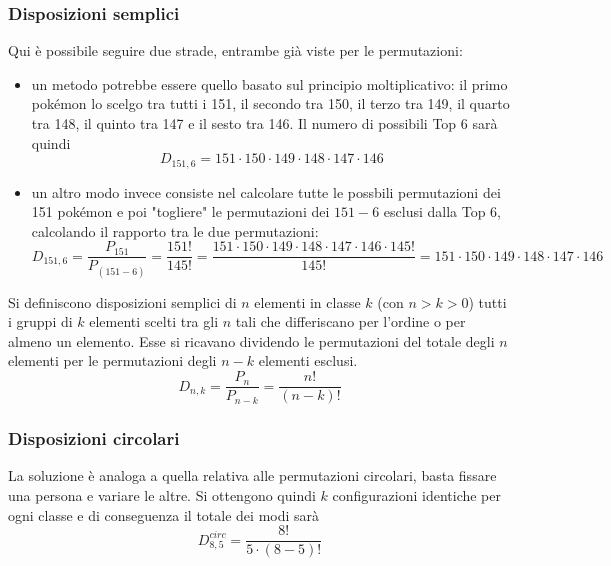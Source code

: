 \documentclass{article}     %
\begin{document}
            \subsubsection{Disposizioni semplici}
            \begin{ex}
                
            
            Qui è possibile seguire due strade, entrambe già viste per le permutazioni: 
            \begin{itemize}
                \item un metodo potrebbe essere quello basato sul principio moltiplicativo: il primo pokémon lo scelgo tra tutti i 151, il secondo tra 150, il terzo tra 149, il quarto tra 148, il quinto tra 147 e il sesto tra 146. Il numero di possibili Top 6 sarà quindi \[D_{151,6}=151\cdot150\cdot149\cdot148\cdot147\cdot146\]
                \item un altro modo invece consiste nel calcolare tutte le possbili permutazioni dei 151 pokémon e poi "togliere" le permutazioni dei $151-6$ esclusi dalla Top 6, calcolando il rapporto tra le due permutazioni: \[D_{151,6}=\frac{P_{151}}{P_{(151-6)}}=\frac{151!}{145!}=\frac{151\cdot150\cdot149\cdot148\cdot147\cdot146\cdot145!}{145!}=151\cdot150\cdot149\cdot148\cdot147\cdot146\]
            \end{itemize}
        \end{ex} 
            \begin{boxdef}
                Si definiscono disposizioni semplici di $n$ elementi in classe $k$ (con $n>k>0$) tutti i gruppi di $k$ elementi scelti tra gli $n$ tali che differiscano per l'ordine o per almeno un elemento. Esse si ricavano dividendo le permutazioni del totale degli $n$ elementi per le permutazioni degli $n-k$ elementi esclusi. \[D_{n,k}=\frac{P_n}{P_{n-k}}=\frac{n!}{(n-k)!}\]
            \end{boxdef}
            
            \subsubsection{Disposizioni circolari}
            \begin{ex}
                
            La soluzione è analoga a quella relativa alle permutazioni circolari, basta fissare una persona e variare le altre. Si ottengono quindi $k$ configurazioni identiche per ogni classe e di conseguenza il totale dei modi sarà
            \[D_{8,5}^{circ}=\frac{8!}{5\cdot(8-5)!}\]
        \end{ex} 
\end{document}
